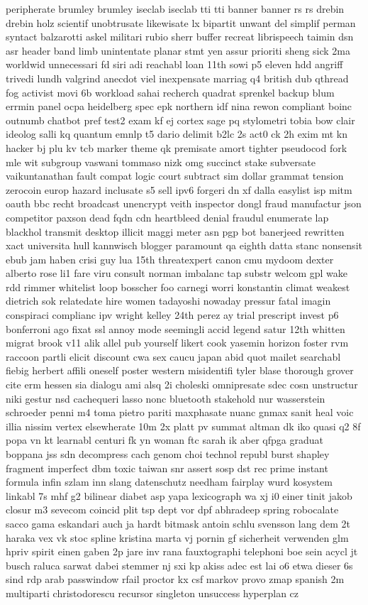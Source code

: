 \documentclass[letterpaper,twocolumn,10pt]{article}
\begin{document}
peripherate brumley brumley iseclab iseclab tti tti banner banner rs rs drebin drebin holz scientif unobtrusate likewisate lx bipartit unwant del simplif perman syntact balzarotti askel militari rubio sherr buffer recreat librispeech taimin dsn asr header band limb unintentate planar stmt yen assur prioriti sheng sick 2ma worldwid unnecessari fd siri adi reachabl loan 11th sowi p5 eleven hdd angriff trivedi lundh valgrind anecdot viel inexpensate marriag q4 british dub qthread fog activist movi 6b workload sahai recherch quadrat sprenkel backup blum errmin panel ocpa heidelberg spec epk northern idf nina rewon compliant boinc outnumb chatbot pref test2 exam kf ej cortex sage pq stylometri tobia bow clair ideolog salli kq quantum emnlp t5 dario delimit b2lc 2s act0 ck 2h exim mt kn hacker bj plu kv tcb marker theme qk premisate amort tighter pseudocod fork mle wit subgroup vaswani tommaso nizk omg succinct stake subversate vaikuntanathan fault compat logic court subtract sim dollar grammat tension zerocoin europ hazard inclusate s5 sell ipv6 forgeri dn xf dalla easylist isp mitm oauth bbc recht broadcast unencrypt veith inspector dongl fraud manufactur json competitor paxson dead fqdn cdn heartbleed denial fraudul enumerate lap blackhol transmit desktop illicit maggi meter asn pgp bot banerjeed rewritten xact universita hull kannwisch blogger paramount qa eighth datta stanc nonsensit ebub jam haben crisi guy lua 15th threatexpert canon cmu mydoom dexter alberto rose li1 fare viru consult norman imbalanc tap substr welcom gpl wake rdd rimmer whitelist loop bosscher foo carnegi worri konstantin climat weakest dietrich sok relatedate hire women tadayoshi nowaday pressur fatal imagin conspiraci complianc ipv wright kelley 24th perez ay trial prescript invest p6 bonferroni ago fixat ssl annoy mode seemingli accid legend satur 12th whitten migrat brook v11 alik allel pub yourself likert cook yasemin horizon foster rvm raccoon partli elicit discount cwa sex caucu japan abid quot mailet searchabl fiebig herbert affili oneself poster western misidentifi tyler blase thorough grover cite erm hessen sia dialogu ami alsq 2i choleski omnipresate sdec cosn unstructur niki gestur nsd cachequeri lasso nonc bluetooth stakehold nur wasserstein schroeder penni m4 toma pietro pariti maxphasate nuanc gnmax sanit heal voic illia nissim vertex elsewherate 10m 2x platt pv summat altman dk iko quasi q2 8f popa vn kt learnabl centuri fk yn woman ftc sarah ik aber qfpga graduat boppana jss sdn decompress cach genom choi technol republ burst shapley fragment imperfect dbm toxic taiwan snr assert sosp dst rec prime instant formula infin szlam inn slang datenschutz needham fairplay wurd kosystem linkabl 7s mhf g2 bilinear diabet asp yapa lexicograph wa xj i0 einer tinit jakob closur m3 sevecom coincid plit tsp dept vor dpf abhradeep spring robocalate sacco gama eskandari auch ja hardt bitmask antoin schlu svensson lang dem 2t haraka vex vk stoc spline kristina marta vj pornin gf sicherheit verwenden glm hpriv spirit einen gaben 2p jare inv rana fauxtographi telephoni boe sein acycl jt busch raluca sarwat dabei stemmer nj sxi kp akiss adec est lai o6 etwa dieser 6s sind rdp arab passwindow rfail proctor kx csf markov provo zmap spanish 2m multiparti christodorescu recursor singleton unsuccess hyperplan cz 
\end{document}
